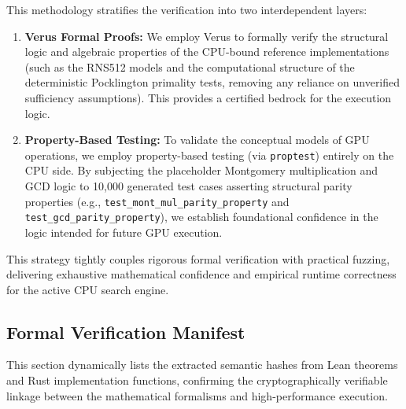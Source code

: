 This methodology stratifies the verification into two interdependent layers:
\begin{enumerate}
    \item \textbf{Verus Formal Proofs:} We employ Verus to formally verify the structural logic and algebraic properties of the CPU-bound reference implementations (such as the RNS512 models and the computational structure of the deterministic Pocklington primality tests, removing any reliance on unverified sufficiency assumptions). This provides a certified bedrock for the execution logic.
    \item \textbf{Property-Based Testing:} To validate the conceptual models of GPU operations, we employ property-based testing (via \texttt{proptest}) entirely on the CPU side. By subjecting the placeholder Montgomery multiplication and GCD logic to 10,000 generated test cases asserting structural parity properties (e.g., \texttt{test\_mont\_mul\_parity\_property} and \texttt{test\_gcd\_parity\_property}), we establish foundational confidence in the logic intended for future GPU execution.
\end{enumerate}

This strategy tightly couples rigorous formal verification with practical fuzzing, delivering exhaustive mathematical confidence and empirical runtime correctness for the active CPU search engine.

\subsection{Formal Verification Manifest}
\label{app:subsec:verification_manifest}
This section dynamically lists the extracted semantic hashes from Lean theorems and Rust implementation functions, confirming the cryptographically verifiable linkage between the mathematical formalisms and high-performance execution.


